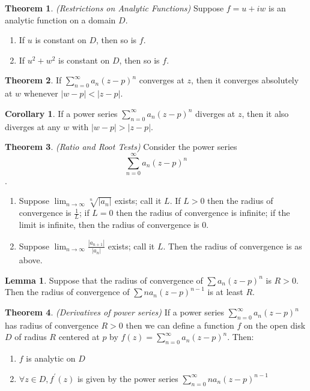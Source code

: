 \documentclass[a4paper]{article}
\theoremstyle{definition}
\newtheorem{theorem}{Theorem}
\newtheorem{lemma}{Lemma}
\newtheorem{corollary}{Corollary}
\begin{document}
	\begin{theorem}
		\emph{(Restrictions on Analytic Functions)}
		Suppose $f = u + iw$ is an analytic function on a domain $D$.
		\begin{enumerate}[label=\alph*.]
			\item If $u$ is constant on $D$, then so is $f$.
			\item If $u^2 + w^2$ is constant on $D$, then so is $f$.
		\end{enumerate}
	\end{theorem}
	
	\begin{theorem}
		If $\sum_{n=0}^{\infty} a_{n}(z - p)^{n}$ converges at $z$, then it converges absolutely at $w$ whenever $|w - p| < |z - p|$.
	\end{theorem}
	
	\begin{corollary}
		If a power series $\sum_{n=0}^{\infty} a_{n}(z - p)^{n}$ diverges at $z$, then it also diverges at any $w$ with $|w-p| > |z-p|$.
	\end{corollary}
	
	\begin{theorem}
		\emph{(Ratio and Root Tests)}
		Consider the power series $$\sum_{n=0}^{\infty} a_{n}(z - p)^{n}$$.
		\begin{enumerate}[label=\alph*.]
			\item Suppose $\lim_{n \rightarrow \infty} \sqrt[n]{|a_{n}|}$ exists; call it $L$. If $L > 0$ then the radius of convergence is $\frac{1}{L}$; if $L = 0$ then the radius of convergence is infinite; if the limit is infinite, then the radius of convergence is 0.
			\item Suppose $\lim_{n \rightarrow \infty} \frac{|a_{n+1}|}{|a_{n}|}$ exists; call it $L$. Then the radius of convergence is as above.
		\end{enumerate}
	\end{theorem}
	
	\begin{lemma}
		Suppose that the radius of convergence of $\sum a_{n}(z - p)^{n}$ is $R > 0$. Then the radius of convergence of $\sum n a_{n} (z-p)^{n-1}$ is at least $R$.
	\end{lemma}
	
	\begin{theorem}
		\emph{(Derivatives of power series)}
		If a power series $\sum_{n=0}^{\infty} a_{n}(z - p)^{n}$ has radius of convergence $R > 0$ then we can define a function $f$ on the open disk $D$ of radius $R$ centered at $p$ by $f(z) = \sum_{n=0}^{\infty} a_{n}(z - p)^{n}$. Then:
		\begin{enumerate}[label=\alph*.]
			\item $f$ is analytic on $D$
			\item $\forall z \in D, f^{\prime}(z)$ is given by the power series $\sum_{n=0}^{\infty} n a_{n}(z - p)^{n-1}$
		\end{enumerate}
	\end{theorem}
	
\end{document}
